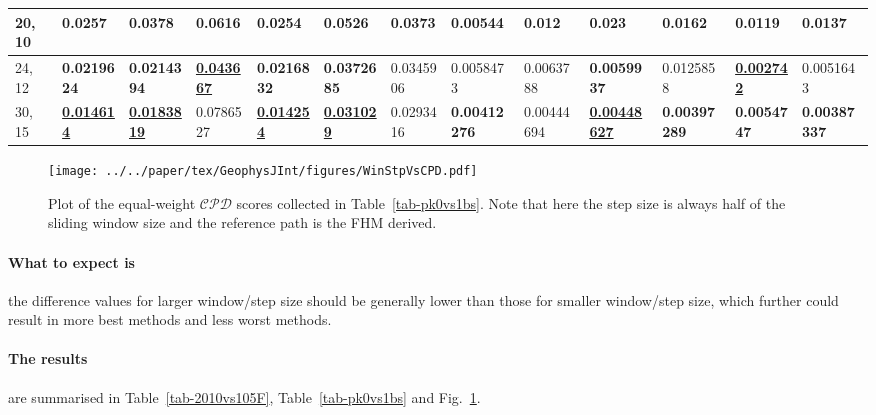 \begin{table*}
{\begin{tabular}{|l|l|l|l|l|l|l|l|l|l|l|l|l|}
20, 10 & {\color[HTML]{34FF34} \textbf{0.0257}} & 0.0378 & 0.0616 &
  0.0254 & 0.0526 & 0.0373 & 0.00544 & 0.012 &
  0.023 & 0.0162 & {\color[HTML]{34FF34} \textbf{0.0119}} & 0.0137 \\ \hline
24, 12 & {\color[HTML]{32CB00} \textbf{0.0219624}} & {\color[HTML]{32CB00}
  \textbf{0.0214394}} & {\color[HTML]{009901} {\ul \textbf{0.043667}}} &
  {\color[HTML]{32CB00} \textbf{0.0216832}} & {\color[HTML]{32CB00}
  \textbf{0.0372685}} & 0.0345906 & 0.0058473 & 0.0063788 &
  {\color[HTML]{32CB00} \textbf{0.0059937}} & 0.0125858 &
  {\color[HTML]{009901} {\ul \textbf{0.002742}}} & 0.0051643 \\ \hline
30, 15 & {\color[HTML]{009901} {\ul \textbf{0.014614}}} & {\color[HTML]{009901}
  {\ul \textbf{0.0183819}}} & 0.0786527 & {\color[HTML]{009901} {\ul
  \textbf{0.014254}}} & {\color[HTML]{009901} {\ul \textbf{0.031029}}} &
  0.0293416 & {\color[HTML]{34FF34} \textbf{0.00412276}} &
  0.00444694 & {\color[HTML]{009901} {\ul
  \textbf{0.00448627}}} & {\color[HTML]{32CB00} \textbf{0.00397289}} &
  {\color[HTML]{32CB00} \textbf{0.0054747}} & {\color[HTML]{32CB00}
  \textbf{0.00387337}} \\ \hline
\end{tabular}%
}
\end{table*}

\begin{figure}
\centering
\texttt{[image: ../../paper/tex/GeophysJInt/figures/WinStpVsCPD.pdf]}
\caption[Sliding window and step sizes versus CPD]{Plot of the equal-weight
  $\mathcal{CPD}$ scores collected in Table~\ref{tab-pk0vs1bs}. Note that here
  the step size is always half of the sliding window size and the reference path
  is the FHM derived.}\label{fig-WinStpVsCPD}
\end{figure}

\paragraph{What to expect is}
the difference values for larger window/step size should be generally lower than
those for smaller window/step size, which further could result in more best
methods and less worst methods.

\paragraph{The results}
are summarised in Table~\ref{tab-2010vs105F}, Table~\ref{tab-pk0vs1bs} and
Fig.~\ref{fig-WinStpVsCPD}.

